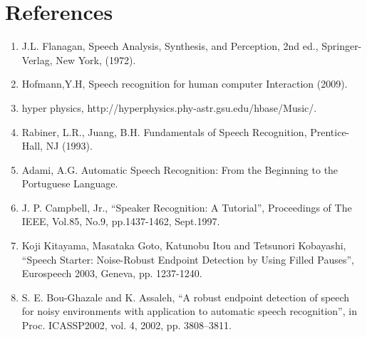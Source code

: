 \documentclass[12pt, a4paper, twoside]{report}
\begin{document}
\section*{References}
\begin{enumerate}
\item J.L. Flanagan, Speech Analysis, Synthesis, and Perception, 2nd ed., Springer-Verlag, New York, (1972).
\item Hofmann,Y.H, Speech recognition for human computer Interaction (2009).
\item hyper physics, http://hyperphysics.phy-astr.gsu.edu/hbase/Music/.
\item Rabiner, L.R., Juang, B.H. Fundamentals of Speech Recognition, Prentice-Hall, NJ (1993).
\item Adami, A.G. Automatic Speech Recognition: From the Beginning to the Portuguese Language.
\item J. P. Campbell, Jr., “Speaker Recognition: A Tutorial”, Proceedings of The IEEE, Vol.85, No.9, pp.1437-1462, Sept.1997. 
\item Koji Kitayama, Masataka Goto, Katunobu Itou and Tetsunori Kobayashi, “Speech Starter: Noise-Robust Endpoint Detection by Using Filled Pauses”, Eurospeech 2003, Geneva, pp. 1237-1240. 
\item S. E. Bou-Ghazale and K. Assaleh, “A robust endpoint detection of speech for noisy environments with application to automatic speech recognition”, in Proc. ICASSP2002, vol. 4, 2002, pp. 3808–3811.
\end{enumerate}
\end{document}
